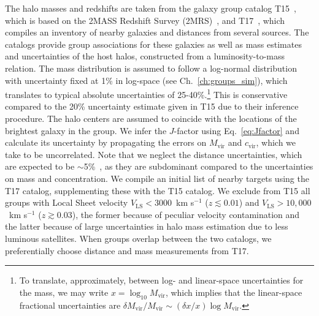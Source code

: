 The halo masses and redshifts are taken from the galaxy group catalog T15~\cite{Tully:2015opa}, which is based on the 2MASS Redshift Survey (2MRS)~\cite{Crook:2006sw}, and T17~\cite{2017ApJ...843...16K}, which compiles an inventory of nearby galaxies and distances from several sources.  The catalogs provide group associations for these galaxies as well as mass estimates and uncertainties of the host halos, constructed from a luminosity-to-mass relation. The mass distribution is assumed to follow a log-normal distribution with uncertainty fixed at 1\% in log-space (see Ch.~\ref{ch:groups_sim}), which translates to typical absolute uncertainties of 25-40\%.\footnote{To translate, approximately, between log- and linear-space uncertainties for the mass, we may write $x = \log_{10} M_\text{vir}$, which implies that the linear-space fractional uncertainties are $\delta M_\text{vir} / M_\text{vir} \sim (\delta x / x) \log M_\text{vir}$. } This is conservative compared to the 20\% uncertainty estimate given in T15 due to their inference procedure. The halo centers are assumed to coincide with the locations of the brightest galaxy in the group.  We infer the $J$-factor using Eq.~\ref{eq:Jfactor} and calculate its uncertainty by propagating the errors on $M_\text{vir}$ and $c_\text{vir}$, which we take to be uncorrelated.  Note that we neglect the distance uncertainties, which are expected to be $\sim$5\%~\cite{Tully:2016ppz,2017ApJ...843...16K}, as they are subdominant compared to the uncertainties on mass and concentration.  We compile an initial list of nearby targets using the T17 catalog, supplementing these with the T15 catalog.  We exclude from T15 all groups with Local Sheet velocity $V_\text{LS} < 3000$~km s$^{-1}$ ($z \lesssim 0.01$) and $V_\text{LS} > 10,000$~km s$^{-1}$ ($z \gtrsim 0.03$), the former because of peculiar velocity contamination and the latter because of large uncertainties in halo mass estimation due to less luminous satellites.  When groups overlap between the two catalogs, we preferentially choose distance and mass measurements from T17.

